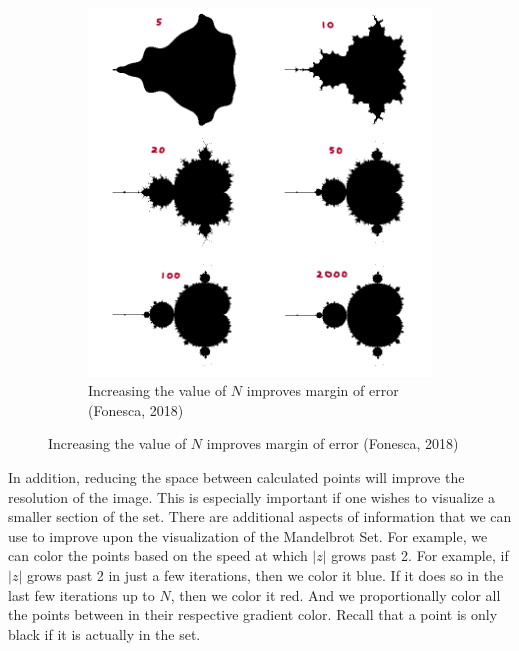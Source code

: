 \documentclass[20pt]{article} %
\begin{document}
\begin{figure}[!htbp]
  	\centering
   	\begin{subfigure}[p]{0.7\linewidth}
    	\includegraphics[width=\linewidth]{./figures/iterationImg.png}
	\caption{Increasing the value of $N$ improves margin of error (Fonesca, 2018)}
   	\end{subfigure}
\end{figure}

\newpage
In addition, reducing the space between calculated points will improve the resolution of the image.  This is especially important if one wishes to visualize a smaller section of the set.
There are additional aspects of information that we can use to improve upon the visualization of the Mandelbrot Set.  For example, we can color the points based on the speed at which $|z|$ grows past 2.  For example, if $|z|$ grows past 2 in just a few iterations, then we color it blue.  If it does so in the last few iterations up to $N$, then we color it red.  And we proportionally color all the points between in their respective gradient color. Recall that a point is only black if it is actually in the set.
\end{document}
